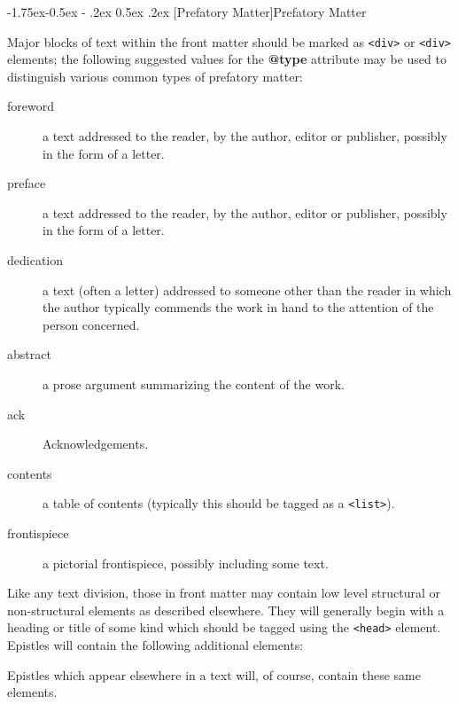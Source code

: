 \documentclass[11pt,twoside]{article}\makeatletter
\makeatletter
\renewcommand\subsection{\@startsection{subsection}{2}{\z@}%
     {-1.75ex\@plus -0.5ex \@minus- .2ex}%
     {0.5ex \@plus .2ex}%
     {\reset@font\Large\sffamily}}
\renewcommand\subsubsection{\@startsection{subsubsection}{3}{\z@}%
     {-1.5ex\@plus -0.35ex \@minus -.2ex}%
     {0.5ex \@plus .2ex}%
     {\reset@font\large\sffamily}}
\def\DivIII{\subsubsection}
\def\DivIII{\subsection}
\makeatother
\begin{document}
\DivIII[Prefatory Matter]{Prefatory Matter}\label{h52}\par
Major blocks of text within the front matter should be marked as \texttt{<div>} or \texttt{<div>} elements; the following suggested values for the \textbf{@type} attribute may be used to distinguish various common types of prefatory matter: \begin{description}

\item[foreword]a text addressed to the reader, by the author, editor or publisher, possibly in the form of a letter.
\item[preface]a text addressed to the reader, by the author, editor or publisher, possibly in the form of a letter.
\item[dedication]a text (often a letter) addressed to someone other than the reader in which the author typically commends the work in hand to the attention of the person concerned.
\item[abstract]a prose argument summarizing the content of the work.
\item[ack]Acknowledgements.
\item[contents]a table of contents (typically this should be tagged as a \texttt{<list>}).
\item[frontispiece]a pictorial frontispiece, possibly including some text.
\end{description} \par
Like any text division, those in front matter may contain low level structural or non-structural elements as described elsewhere. They will generally begin with a heading or title of some kind which should be tagged using the \texttt{<head>} element. Epistles will contain the following additional elements: \par
 Epistles which appear elsewhere in a text will, of course, contain these same elements.\par
\end{document}
